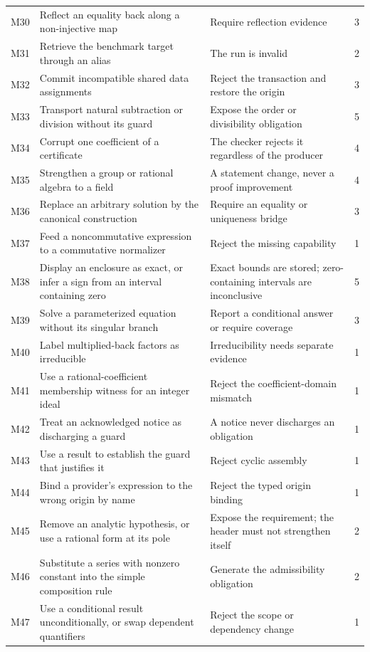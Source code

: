 \documentclass[11pt,a4paper]{article}
\theoremstyle{definition}
\begin{document}
\begin{longtable}{@{}L{8mm}L{58mm}L{72mm}r@{}}
M30 & Reflect an equality back along a non-injective map & Require reflection evidence & 3\\
M31 & Retrieve the benchmark target through an alias & The run is invalid & 2\\
M32 & Commit incompatible shared data assignments & Reject the transaction and restore the origin & 3\\
M33 & Transport natural subtraction or division without its guard & Expose the order or divisibility obligation & 5\\
M34 & Corrupt one coefficient of a certificate & The checker rejects it regardless of the producer & 4\\
M35 & Strengthen a group or rational algebra to a field & A statement change, never a proof improvement & 4\\
M36 & Replace an arbitrary solution by the canonical construction & Require an equality or uniqueness bridge & 3\\
M37 & Feed a noncommutative expression to a commutative normalizer & Reject the missing capability & 1\\
M38 & Display an enclosure as exact, or infer a sign from an interval containing zero & Exact bounds are stored; zero-containing intervals are inconclusive & 5\\
M39 & Solve a parameterized equation without its singular branch & Report a conditional answer or require coverage & 3\\
M40 & Label multiplied-back factors as irreducible & Irreducibility needs separate evidence & 1\\
M41 & Use a rational-coefficient membership witness for an integer ideal & Reject the coefficient-domain mismatch & 1\\
M42 & Treat an acknowledged notice as discharging a guard & A notice never discharges an obligation & 1\\
M43 & Use a result to establish the guard that justifies it & Reject cyclic assembly & 1\\
M44 & Bind a provider's expression to the wrong origin by name & Reject the typed origin binding & 1\\
M45 & Remove an analytic hypothesis, or use a rational form at its pole & Expose the requirement; the header must not strengthen itself & 2\\
M46 & Substitute a series with nonzero constant into the simple composition rule & Generate the admissibility obligation & 2\\
M47 & Use a conditional result unconditionally, or swap dependent quantifiers & Reject the scope or dependency change & 1\\

\end{longtable}
\end{document}
